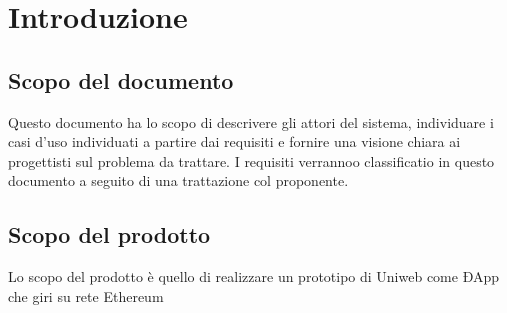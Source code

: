\section{Introduzione}
\subsection{Scopo del documento}
Questo documento ha lo scopo di descrivere gli attori del sistema, individuare i casi d'uso individuati a partire dai requisiti e fornire una visione chiara ai progettisti sul problema da trattare. I requisiti verrannoo classificatio in questo documento a seguito di una trattazione col proponente.

\subsection{Scopo del prodotto}
Lo scopo del prodotto è quello di realizzare un prototipo di Uniweb come ÐApp che giri su rete Ethereum 